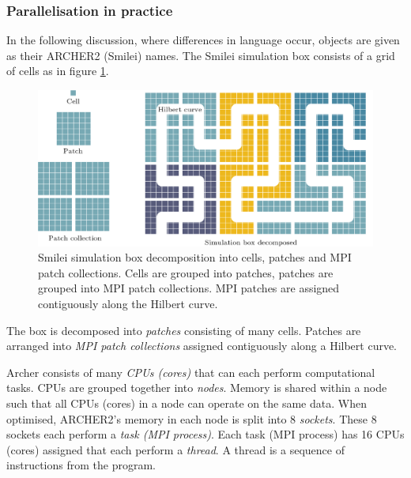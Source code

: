 \subsubsection{Parallelisation in practice}
In the following discussion, where differences in language occur, objects are given as their ARCHER2 (Smilei) names. The Smilei simulation box consists of a grid of cells as in figure \ref{fig:introsmileiparallelisation}.
\begin{figure}
	\centering
	\includegraphics[width=1\linewidth]{figures/intro/intro_smilei_parallelisation}
	\caption[Smilei simulation box decomposition into cells, patches and MPI patch collections.]{Smilei simulation box decomposition into cells, patches and MPI patch collections. Cells are grouped into patches, patches are grouped into MPI patch collections. MPI patches are assigned contiguously along the Hilbert curve.}
	\label{fig:introsmileiparallelisation}
\end{figure}
The box is decomposed into \textit{patches} consisting of many cells. Patches are arranged into \textit{MPI patch collections} assigned contiguously along a Hilbert curve.

Archer consists of many \textit{CPUs (cores)} that can each perform computational tasks. CPUs are grouped together into \textit{nodes}. Memory is shared within a node such that all CPUs (cores) in a node can operate on the same data. When optimised, ARCHER2’s memory in each node is split into 8 \textit{sockets}. These 8 sockets each perform a \textit{task (MPI process)}. Each task (MPI process) has 16 CPUs (cores) assigned that each perform a \textit{thread}. A thread is a sequence of instructions from the program.

